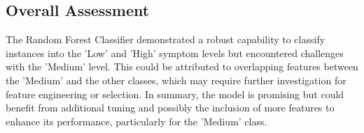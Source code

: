 \documentclass[10pt, oneside]{article}   	%
\begin{document}
\subsection{Overall Assessment}
The Random Forest Classifier demonstrated a robust capability to classify instances into the 'Low' and 'High' symptom levels but encountered challenges with the 'Medium' level. This could be attributed to overlapping features between the 'Medium' and the other classes, which may require further investigation for feature engineering or selection. In summary, the model is promising but could benefit from additional tuning and possibly the inclusion of more features to enhance its performance, particularly for the 'Medium' class.
\end{document}
